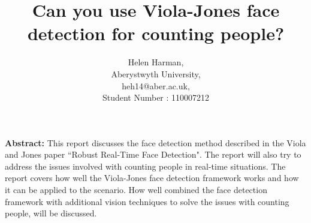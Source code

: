 \documentclass[10pt,a4paper,openbib]{article}
\author{Helen Harman, \\Aberystwyth University, \\heh14@aber.ac.uk,\\ Student Number : 110007212}
\title{Can you use Viola-Jones face detection for counting people?}
\begin{document}
\maketitle

\section*{\vspace{-1.2cm} }
\textbf{Abstract:} This report discusses the face detection method described in the Viola and Jones paper ``Robust Real-Time Face Detection"\cite{violaJones}. The report will also try to address the issues involved with counting people in real-time situations. The report covers how well the Viola-Jones face detection framework works and how it can be applied to the scenario. How well combined the face detection framework with additional vision techniques to solve the issues with counting people, will be discussed. 
\end{document}
